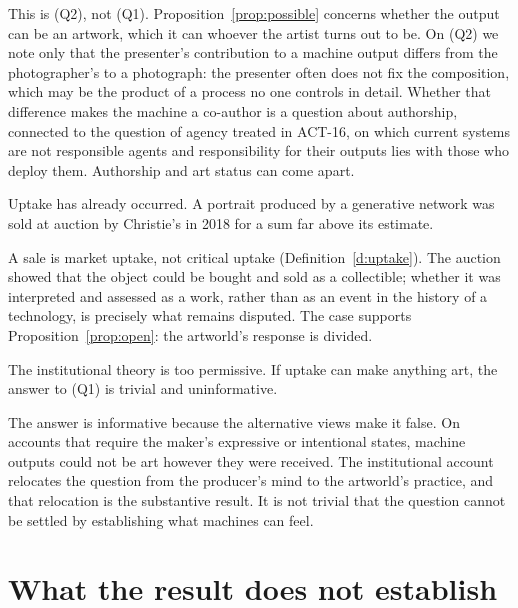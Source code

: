 \documentclass{situationist-preprint}
\begin{document}
\begin{reply}
This is (Q2), not (Q1). Proposition~\ref{prop:possible} concerns whether the output can be an artwork, which it can whoever the artist turns out to be. On (Q2) we note only that the presenter's contribution to a machine output differs from the photographer's to a photograph: the presenter often does not fix the composition, which may be the product of a process no one controls in detail. Whether that difference makes the machine a co-author is a question about authorship, connected to the question of agency treated in ACT-16, on which current systems are not responsible agents and responsibility for their outputs lies with those who deploy them. Authorship and art status can come apart.
\end{reply}

\begin{objection}
Uptake has already occurred. A portrait produced by a generative network was sold at auction by Christie's in 2018 for a sum far above its estimate.
\end{objection}

\begin{reply}
A sale is market uptake, not critical uptake (Definition~\ref{d:uptake}). The auction showed that the object could be bought and sold as a collectible; whether it was interpreted and assessed as a work, rather than as an event in the history of a technology, is precisely what remains disputed. The case supports Proposition~\ref{prop:open}: the artworld's response is divided.
\end{reply}

\begin{objection}
The institutional theory is too permissive. If uptake can make anything art, the answer to (Q1) is trivial and uninformative.
\end{objection}

\begin{reply}
The answer is informative because the alternative views make it false. On accounts that require the maker's expressive or intentional states, machine outputs could not be art however they were received. The institutional account relocates the question from the producer's mind to the artworld's practice, and that relocation is the substantive result. It is not trivial that the question cannot be settled by establishing what machines can feel.
\end{reply}

\section{What the result does not establish}
\end{document}
